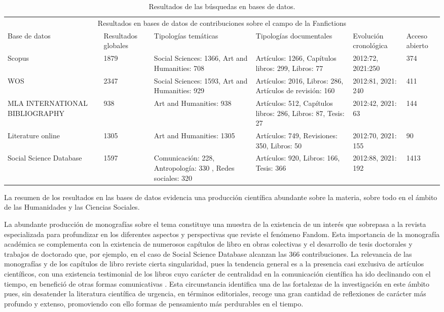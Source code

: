 \documentclass[spanish]{textolivre}
\begin{document}
\begin{table}[h!]
\footnotesize
\begin{threeparttable}
\caption{Resultados de las búsquedas en bases de datos.}
\label{tab01}
\centering
\begin{tabular}{p{2cm} p{1.5cm} p{2.7cm} p{2.7cm} p{2cm} p{1.3cm}}
\toprule
\multicolumn{6}{c}{Resultados en bases de datos de contribuciones sobre el campo de la Fanfictions} \\
Base de datos & Resultados globales & Tipologías temáticas & Tipologías documentales & Evolución cronológica & Acceso abierto  \\
\midrule
Scopus & 1879 & Social Sciences: 1366, Art and Humanities: 708 & Artículos: 1266, Capítulos libros: 299, Libros: 77 & 2012:72, 2021:250 & 374  \\
WOS & 2347 & Social Sciences: 1593, Art and Humanities: 929 & Artículos: 2016, Libros: 286, Artículos de revisión: 160 & 2012:81, 2021: 240 & 411 \\
MLA INTERNATIONAL BIBLIOGRAPHY & 938 & Art and Humanities: 938 & Artículos: 512, Capítulos libros: 286, Libros: 87, Tesis: 27 & 2012:42, 2021: 63 & 144 \\
Literature online & 1305 & Art and Humanities: 1305 & Artículos: 749, Revisiones: 350, Libros: 50 & 2012:70, 2021: 155 & 90 \\
Social Science Database & 1597 & Comunicación: 228, Antropología: 330 , Redes sociales: 320 & Artículos: 920, Libros: 166, Tesis: 366 & 2012:88, 2021: 192 & 1413 \\
\bottomrule
\end{tabular}
\end{threeparttable}
\end{table}

La  resumen de los resultados en las bases de datos evidencia una producción científica abundante sobre la materia, sobre todo en el ámbito de las Humanidades y las Ciencias Sociales. 

La abundante producción de monografías sobre el tema constituye una muestra de la existencia de un interés que sobrepasa a la revista especializada para profundizar en los diferentes aspectos y perspectivas que reviste el fenómeno Fandom. Esta importancia de la monografía académica se complementa con la existencia de numerosos capítulos de libro en obras colectivas y el desarrollo de tesis doctorales y trabajos de doctorado que, por ejemplo, en el caso de Social Science Database alcanzan las 366 contribuciones. La relevancia de las monografías y de los capítulos de libro reviste cierta singularidad, pues la tendencia general es a la presencia casi exclusiva de artículos científicos, con una existencia testimonial de los libros cuyo carácter de centralidad en la comunicación científica ha ido declinando con el tiempo, en benefició de otras formas comunicativas \cite{cordon-garcia_publishing_2022,cordon-garcia_evolution_2019}. Esta circunstancia identifica una de las fortalezas de la investigación en este ámbito pues, sin desatender la literatura científica de urgencia, en términos editoriales, recoge una gran cantidad de reflexiones de carácter más profundo y extenso, promoviendo con ello formas de pensamiento más perdurables en el tiempo. 
\end{document}
